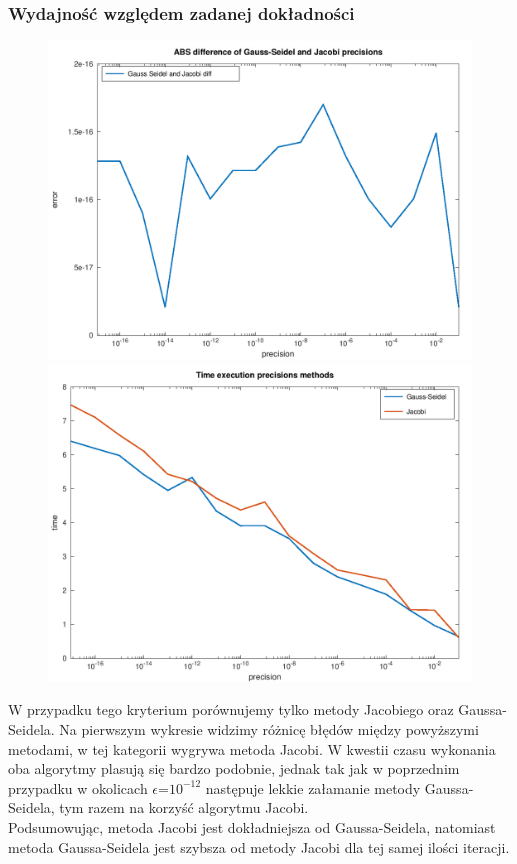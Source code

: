 \documentclass[10pt]{article}
\begin{document}
\subsubsection{Wydajność względem zadanej dokładności}
\begin{figure}[h]
\centering
\includegraphics[scale=0.45]{plots/05_abs_precision_methods_all_rows.png}
\includegraphics[scale=0.45]{plots/06_time_precision_methods_all_rows.png}
\end{figure}
W przypadku tego kryterium porównujemy tylko metody Jacobiego oraz Gaussa-Seidela. Na pierwszym wykresie widzimy różnicę błędów między powyższymi metodami, w tej kategorii wygrywa metoda Jacobi. W kwestii czasu wykonania oba algorytmy plasują się bardzo podobnie, jednak tak jak w poprzednim przypadku w okolicach $\epsilon$=$10^{-12}$ następuje lekkie załamanie metody Gaussa-Seidela, tym razem na korzyść algorytmu Jacobi.\\
Podsumowując, metoda Jacobi jest dokładniejsza od Gaussa-Seidela, natomiast metoda Gaussa-Seidela jest szybsza od metody Jacobi dla tej samej ilości iteracji.
\end{document}

